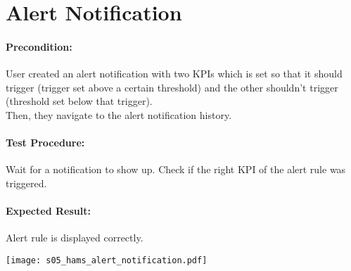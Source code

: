 \documentclass{scrreprt}
\begin{document}
\begin{minipage}[c]{0.4\textwidth}
\section{Alert Notification}

\paragraph{Precondition:}
User created an alert notification with two KPIs which is set so that it
should trigger (trigger set above a certain threshold) and the other shouldn't trigger (threshold set below that trigger).\\
Then, they navigate to the alert notification history.\\

\paragraph{Test Procedure:}
Wait for a notification to show up. Check if the right KPI of the alert rule was triggered.\\

\paragraph{Expected Result:}
Alert rule is displayed correctly.

\end{minipage}
\hfill
\begin{minipage}[c]{0.5\textwidth}
	\texttt{[image: s05\_hams\_alert\_notification.pdf]}
\end{minipage}
\end{document}
